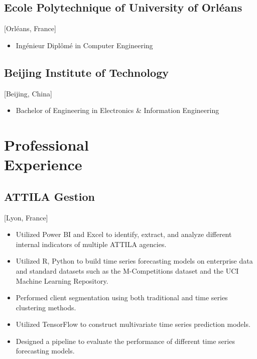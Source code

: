 \documentclass{mycv}
\begin{document}
\subsection{Ecole Polytechnique of University of Orl\'eans}[Orl\'eans, France]
\begin{itemize}[label={}]
  \item Ing\'enieur Dipl\^om\'e in Computer Engineering 
\end{itemize}

\subsection{Beijing Institute of Technology}[Beijing, China]
\begin{itemize}[label={}]
  \item Bachelor of Engineering in Electronics \& Information Engineering 
\end{itemize}

\section{Professional \\ Experience}

\subsection{ATTILA Gestion}[Lyon, France]
\begin{positions}
\end{positions}

\begin{itemize}
  \item Utilized Power BI and Excel to identify, extract, and analyze different internal indicators of multiple ATTILA agencies.
  \item Utilized R, Python to build time series forecasting models on enterprise data and standard datasets such as the M-Competitions dataset and the UCI Machine Learning Repository.
  \item Performed client segmentation using both traditional and time series clustering methods.
  \item Utilized TensorFlow to construct multivariate time series prediction models.
  \item Designed a pipeline to evaluate the performance of different time series forecasting models.
\end{itemize}
\end{document}
